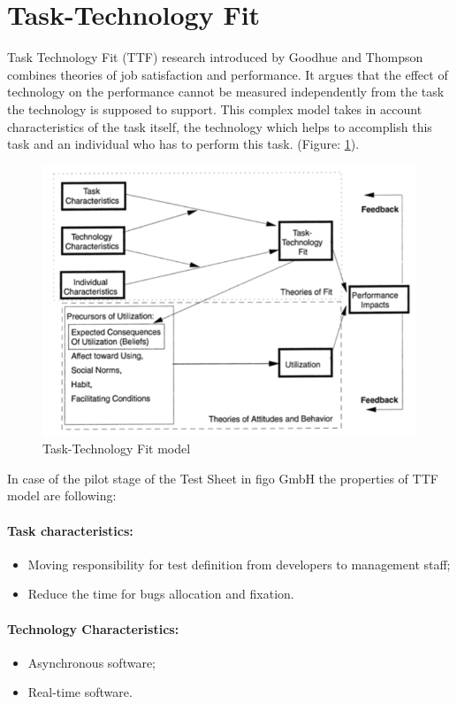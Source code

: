 \section{Task-Technology Fit}
Task Technology Fit (TTF) research introduced by Goodhue and Thompson \cite{MES10} combines theories of job satisfaction and performance. It argues that the effect of technology on the performance cannot be measured independently from the task the technology is supposed to support. This complex model takes in account characteristics of the task itself, the technology which helps to accomplish this task and an individual who has to perform this task. (Figure: \ref{fig:ttf}).
\begin{figure}[ht]
	\label{fig:ttf}
	\centering
	\includegraphics[width=\textwidth]{grafiken/ttf.png}
	\caption{Task-Technology Fit model\cite{MES10}}
\end{figure}

In case of the pilot stage of the Test Sheet in figo GmbH the properties of TTF model are following:
\paragraph{Task characteristics:}
\begin{itemize}
	\item Moving responsibility for test definition from developers to management staff;
	\item Reduce the time for bugs allocation and fixation.
\end{itemize}


\paragraph{Technology Characteristics:}
\begin{itemize}
	\item Asynchronous software;
	\item Real-time software.
\end{itemize}

